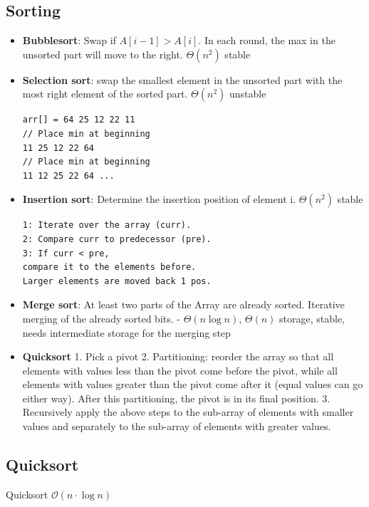 \documentclass[9pt,landscape,a4paper, table]{extarticle}
\begin{document}
\begin{multicols*}{3}
\section{Sorting}

\begin{itemize}
    \item \textbf{Bubblesort}: Swap if $A[i-1]> A[i]$. In each round, the max in the unsorted part will move to the right. $\Theta(n^2)$ stable
    \item \textbf{Selection sort}: swap the smallest element in the unsorted part with the most right element of the sorted part. $\Theta(n^2)$ unstable
    
    \begin{verbatim}
arr[] = 64 25 12 22 11
// Place min at beginning
11 25 12 22 64
// Place min at beginning
11 12 25 22 64 ...
    \end{verbatim}
    
    \item \textbf{Insertion sort}: Determine the insertion position of element i. $\Theta(n^2)$ stable
    
\begin{verbatim}
1: Iterate over the array (curr).
2: Compare curr to predecessor (pre).
3: If curr < pre,
compare it to the elements before.
Larger elements are moved back 1 pos.
\end{verbatim}
    \item \textbf{Merge sort}: At least two parts of the Array are already sorted. Iterative merging of the already sorted bits. - $\Theta(n \log n)$,  $\Theta(n)$ storage, stable,  needs intermediate storage for the merging step

\item \textbf{Quicksort}
1. Pick a pivot 2. Partitioning: reorder the array so that all elements with values less than the pivot come before the pivot, while all elements with values greater than the pivot come after it (equal values can go either way). After this partitioning, the pivot is in its final position. 3. Recursively apply the above steps to the sub-array of elements with smaller values and separately to the sub-array of elements with greater values.
\end{itemize}



\subsection{Quicksort}
{\scriptsize
\begin{algorithm}[H]
    \caption{Quicksort $\mathcal{O}(n\cdot \log n)$}
    

\end{algorithm}}
\end{multicols*}
\end{document}
